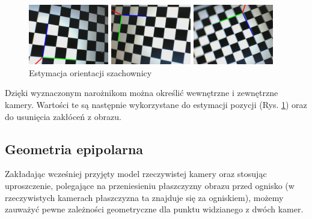 \documentclass[oneside, eng]{mgr}
\begin{document}
\begin{figure}
\centering
		\begin{minipage}{3.5cm}
			\includegraphics[width=3.5cm]{img/left8.jpg}
		\end{minipage}
		\begin{minipage}{3.5cm}
			\includegraphics[width=3.5cm]{img/left17.jpg}
		\end{minipage}
		\begin{minipage}{3.5cm}
			\includegraphics[width=3.5cm]{img/left24.jpg}
		\end{minipage}
	\caption{Estymacja orientacji szachownicy}
	\label{fig:pose}
\end{figure}

Dzięki wyznaczonym narożnikom można określić wewnętrzne i zewnętrzne kamery. Wartości te są następnie wykorzystane do estymacji pozycji (Rys. \ref{fig:pose}) oraz do usunięcia zakłóceń z obrazu. 

\subsection{Geometria epipolarna}

Zakładając wcześniej przyjęty model rzeczywistej kamery oraz stosując uproszczenie, polegające na przeniesieniu płaszczyzny obrazu przed ognisko (w rzeczywistych kamerach płaszczyzna ta znajduje się za ogniskiem), możemy zauważyć pewne zależności geometryczne dla punktu widzianego z dwóch kamer. 
\end{document}
